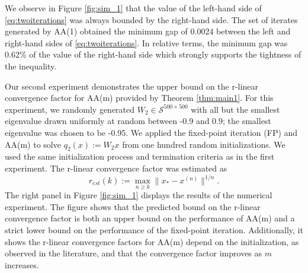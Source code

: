 \documentclass[11pt]{article}
\begin{document}
We observe in Figure \ref{fig:sim_1} that the value of the left-hand side of \eqref{eq:twoiterations} was always bounded by the right-hand side. 
The set of iterates generated by AA(1) obtained the minimum gap of 0.0024  between the left and right-hand sides of \eqref{eq:twoiterations}.
In relative terms, the minimum gap was 0.62\% of the value of the right-hand side which strongly supports the tightness of the inequality. 

Our second experiment demonstrates the upper bound on the r-linear convergence factor for AA(m) provided by Theorem \ref{thm:main1}. 
For this experiment, we randomly generated ${W}_2 \in \mathcal{S}^{500 \times 500}$ with all but the smallest eigenvalue drawn uniformly at random between -0.9 and 0.9; the smallest eigenvalue was chosen to be -0.95. 
We applied the fixed-point iteration (FP) and AA(m) to solve $q_2(x):= {W}_2 x$ from one hundred random initializations. We used the same initialization process and termination criteria as in the first experiment.
The r-linear convergence factor was estimated as 
\begin{equation}\label{eq:r_estM}
r_{est}(k):= \max_{n\geq k} \|x_* - x^{(n)}\|^{1/n}. 
\end{equation}
The right panel in Figure \ref{fig:sim_1} displays the results of the numerical experiment. The figure shows that the predicted bound on the r-linear convergence factor is both an upper bound on the performance of AA(m) and a strict lower bound on the performance of the fixed-point iteration. 
Additionally, it shows the r-linear convergence factors for AA(m) depend on the initialization, as observed in the literature, and that the convergence factor improves as $m$ increases. 
\end{document}
